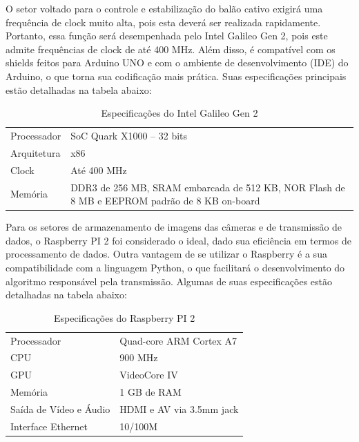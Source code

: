 	O setor voltado para o controle e estabilização do balão cativo exigirá uma frequência de clock muito alta, pois esta deverá ser realizada rapidamente. Portanto,  essa função será desempenhada pelo Intel Galileo Gen 2, pois este admite frequências de clock de até 400 MHz. Além disso, é compatível com os shields feitos para Arduino UNO e com o ambiente de desenvolvimento (IDE) do Arduino, o que torna sua codificação mais prática. Suas especificações principais estão detalhadas na tabela abaixo:

	\begin{table}[h!]
		\centering
		\begin{tabular}{l|p{}}
			\toprule
			Processador & SoC Quark X1000 – 32 bits \\
			Arquitetura & x86 \\
			Clock & Até 400 MHz \\
			Memória & DDR3 de 256 MB, SRAM embarcada de 512 KB, NOR Flash de 8 MB e EEPROM padrão de 8 KB on-board \\
			\bottomrule
		\end{tabular}
		\caption{Especificações do Intel Galileo Gen 2}
		\label{tab:galileu}
	\end{table}

	Para os setores de armazenamento de imagens das câmeras e de transmissão de dados, o Raspberry PI 2 foi considerado o ideal, dado sua eficiência em termos de processamento de dados. Outra vantagem de se utilizar o Raspberry é a sua compatibilidade com a linguagem Python, o que facilitará o desenvolvimento do algoritmo responsável pela transmissão. Algumas de suas especificações estão detalhadas na tabela abaixo:

	\begin{table}[h!]
		\centering
		\begin{tabular}{l|l}
			\toprule
			Processador & Quad-core ARM Cortex A7 \\
			CPU &	900 MHz \\
			GPU & VideoCore IV \\
			Memória & 1 GB de RAM \\
			Saída de Vídeo e Áudio & HDMI e AV via 3.5mm jack \\
			Interface Ethernet &	10/100M \\
			\bottomrule
		\end{tabular}
		\caption{Especificações do Raspberry PI 2}
		\label{tab:rasperry}
	\end{table}

